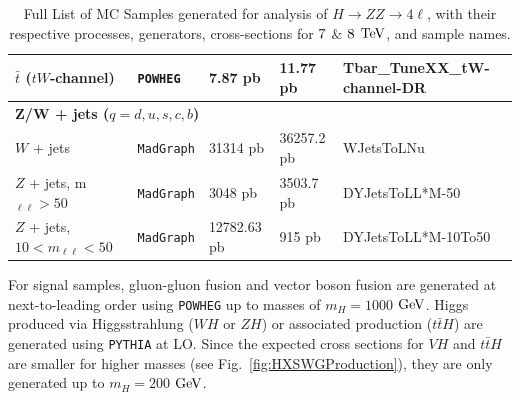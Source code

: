\begin{table}[htbp]
\begin{center}
\begin{tabular}{lllll}
\small   $\bar{t}$ ($tW$-channel)   	& \small{\tt POWHEG} 		& \small 7.87 pb 	& \small 11.77 pb				& \small{\small Tbar\_TuneXX\_tW-channel-DR} \\ 
\hline %
          \multicolumn{5}{l}{\bf{Z/W + jets ($q=d,u,s,c,b$)}} \\     
\small   $W$ + jets     			& \small{\tt MadGraph}		& \small 31314 pb         & \small 36257.2 pb			& \small{\small WJetsToLNu} \\
\small   $Z$ + jets, m$_{\ell\ell}>50$     		& \small{\tt MadGraph}		& \small 3048 pb           & \small 3503.7 pb			& \small{\small DYJetsToLL*M-50} \\ 
\small   $Z$ + jets, $10<m_{\ell\ell}<50$     	& \small{\tt MadGraph}		& \small 12782.63 pb    & \small 915   pb			& \small{\small DYJetsToLL*M-10To50} \\ 
\hline %
   \end{tabular}
\caption[MC Samples for $H\rightarrow ZZ\rightarrow 4\ell$]{Full List of MC Samples generated for analysis of $H\rightarrow ZZ\rightarrow 4\ell$, with their respective processes, generators, cross-sections for $\rm{7}$ $\&$ $\rm{8}$ $\rm{TeV}$, and sample names.}
  \label{tbl:MCSamples}
  \end{center}
\end{table}

For signal samples, gluon-gluon fusion and vector boson fusion are generated at next-to-leading order using {\tt POWHEG} \cite{powheg} up to masses of $m_H = 1000$ $\rm{GeV}$. Higgs produced via Higgsstrahlung ($WH$ or $ZH$) or associated production ($t\bar{t}H$) are generated using {\tt PYTHIA} \cite{Sjostrand:2006za} at LO. Since the expected cross sections for $VH$ and $t\bar{t}H$ are smaller for higher masses (see Fig.~\ref{fig:HXSWGProduction}), they are only generated up to $m_H=200$ $\rm{GeV}$.

